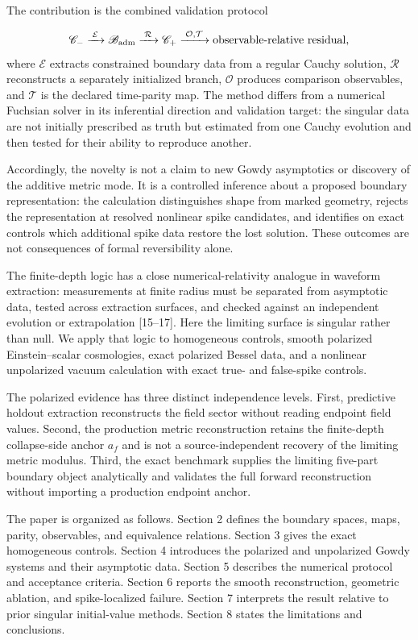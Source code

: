 \documentclass{iopjournal}
\begin{document}
The contribution is the combined validation protocol

\[
\mathscr C_-
\xrightarrow{\;\mathcal E\;}
\mathscr B_{\rm adm}
\xrightarrow{\;\mathcal R\;}
\mathscr C_+
\xrightarrow{\;\mathcal O,\mathcal T\;}
\text{observable-relative residual},
\]
where $\mathcal E$ extracts constrained boundary data from a regular Cauchy solution, $\mathcal R$ reconstructs a separately initialized branch, $\mathcal O$ produces comparison observables, and $\mathcal T$ is the declared time-parity map. The method differs from a numerical Fuchsian solver in its inferential direction and validation target: the singular data are not initially prescribed as truth but estimated from one Cauchy evolution and then tested for their ability to reproduce another.

Accordingly, the novelty is not a claim to new Gowdy asymptotics or discovery of the additive metric mode. It is a controlled inference about a proposed boundary representation: the calculation distinguishes shape from marked geometry, rejects the representation at resolved nonlinear spike candidates, and identifies on exact controls which additional spike data restore the lost solution. These outcomes are not consequences of formal reversibility alone.

The finite-depth logic has a close numerical-relativity analogue in waveform extraction: measurements at finite radius must be separated from asymptotic data, tested across extraction surfaces, and checked against an independent evolution or extrapolation [15--17]. Here the limiting surface is singular rather than null. We apply that logic to homogeneous controls, smooth polarized Einstein--scalar cosmologies, exact polarized Bessel data, and a nonlinear unpolarized vacuum calculation with exact true- and false-spike controls.

The polarized evidence has three distinct independence levels. First, predictive holdout extraction reconstructs the field sector without reading endpoint field values. Second, the production metric reconstruction retains the finite-depth collapse-side anchor $a_f$ and is not a source-independent recovery of the limiting metric modulus. Third, the exact benchmark supplies the limiting five-part boundary object analytically and validates the full forward reconstruction without importing a production endpoint anchor.

The paper is organized as follows. Section 2 defines the boundary spaces, maps, parity, observables, and equivalence relations. Section 3 gives the exact homogeneous controls. Section 4 introduces the polarized and unpolarized Gowdy systems and their asymptotic data. Section 5 describes the numerical protocol and acceptance criteria. Section 6 reports the smooth reconstruction, geometric ablation, and spike-localized failure. Section 7 interprets the result relative to prior singular initial-value methods. Section 8 states the limitations and conclusions.
\end{document}
